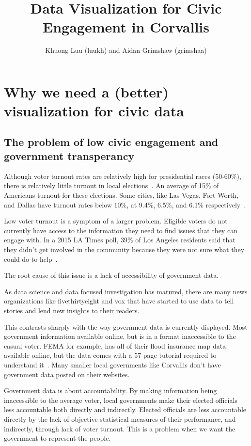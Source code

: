 \documentclass{article}
\title{Data Visualization for Civic Engagement in Corvallis}
\author{Khuong Luu (luukh) and Aidan Grimshaw (grimshaa)}
\begin{document}
\maketitle
\tableofcontents

\section{Why we need a (better) visualization for civic data}

\subsection{The problem of low civic engagement and government transperancy}

Although voter turnout rates are relatively high for presidential races (50-60\%), there is relatively little turnout in local elections~\cite{CityLab}. An average of 15\% of Americans turnout for these elections. Some cities, like Las Vegas, Fort Worth, and Dallas have turnout rates below 10\%, at 9.4\%, 6.5\%, and 6.1\% respectively~\cite{Whovotesmayor}.

Low voter turnout is a symptom of a larger problem. Eligible voters do not currently have access to the information they need to find issues that they can engage with. In a 2015 LA Times poll,  39\% of Los Angeles residents said that they didn’t get involved in the community because they were not sure what they could do to help~\cite{Moreinvolve}.

The root cause of this issue is a lack of accessibility of government data.

As data science and data focused investigation has matured, there are many news organizations like fivethirtyeight and vox that have started to use data to tell stories and lend new insights to their readers.

This contrasts sharply with the way government data is currently displayed. Most government information available online, but is in a format inaccessible to the casual voter. FEMA for example, has all of their flood insurance map data available online, but the data comes with a 57 page tutorial required to understand it~\cite{FloodInsurance}. Many smaller local governments like Corvallis don’t have government data posted on their websites.

Government data is about accountability. By making information being inaccessible to the average voter, local governments make their elected officials less accountable both directly and indirectly. Elected officials are less accountable directly by the lack of objective statistical measures of their performance, and indirectly, through lack of voter turnout. This is a problem when we want the government to represent the people.
\end{document}
